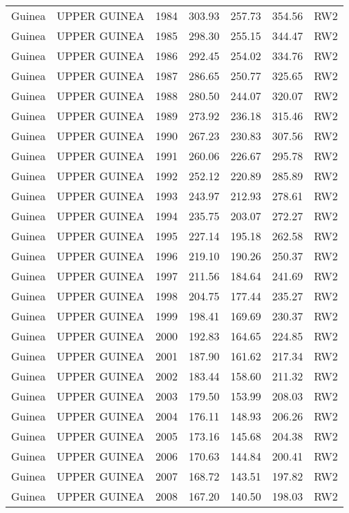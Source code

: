 \begin{longtable}{lllrrrl}
  Guinea & UPPER GUINEA & 1984 & 303.93 & 257.73 & 354.56 & RW2 \\ 
  Guinea & UPPER GUINEA & 1985 & 298.30 & 255.15 & 344.47 & RW2 \\ 
  Guinea & UPPER GUINEA & 1986 & 292.45 & 254.02 & 334.76 & RW2 \\ 
  Guinea & UPPER GUINEA & 1987 & 286.65 & 250.77 & 325.65 & RW2 \\ 
  Guinea & UPPER GUINEA & 1988 & 280.50 & 244.07 & 320.07 & RW2 \\ 
  Guinea & UPPER GUINEA & 1989 & 273.92 & 236.18 & 315.46 & RW2 \\ 
  Guinea & UPPER GUINEA & 1990 & 267.23 & 230.83 & 307.56 & RW2 \\ 
  Guinea & UPPER GUINEA & 1991 & 260.06 & 226.67 & 295.78 & RW2 \\ 
  Guinea & UPPER GUINEA & 1992 & 252.12 & 220.89 & 285.89 & RW2 \\ 
  Guinea & UPPER GUINEA & 1993 & 243.97 & 212.93 & 278.61 & RW2 \\ 
  Guinea & UPPER GUINEA & 1994 & 235.75 & 203.07 & 272.27 & RW2 \\ 
  Guinea & UPPER GUINEA & 1995 & 227.14 & 195.18 & 262.58 & RW2 \\ 
  Guinea & UPPER GUINEA & 1996 & 219.10 & 190.26 & 250.37 & RW2 \\ 
  Guinea & UPPER GUINEA & 1997 & 211.56 & 184.64 & 241.69 & RW2 \\ 
  Guinea & UPPER GUINEA & 1998 & 204.75 & 177.44 & 235.27 & RW2 \\ 
  Guinea & UPPER GUINEA & 1999 & 198.41 & 169.69 & 230.37 & RW2 \\ 
  Guinea & UPPER GUINEA & 2000 & 192.83 & 164.65 & 224.85 & RW2 \\ 
  Guinea & UPPER GUINEA & 2001 & 187.90 & 161.62 & 217.34 & RW2 \\ 
  Guinea & UPPER GUINEA & 2002 & 183.44 & 158.60 & 211.32 & RW2 \\ 
  Guinea & UPPER GUINEA & 2003 & 179.50 & 153.99 & 208.03 & RW2 \\ 
  Guinea & UPPER GUINEA & 2004 & 176.11 & 148.93 & 206.26 & RW2 \\ 
  Guinea & UPPER GUINEA & 2005 & 173.16 & 145.68 & 204.38 & RW2 \\ 
  Guinea & UPPER GUINEA & 2006 & 170.63 & 144.84 & 200.41 & RW2 \\ 
  Guinea & UPPER GUINEA & 2007 & 168.72 & 143.51 & 197.82 & RW2 \\ 
  Guinea & UPPER GUINEA & 2008 & 167.20 & 140.50 & 198.03 & RW2 \\ 

\end{longtable}
